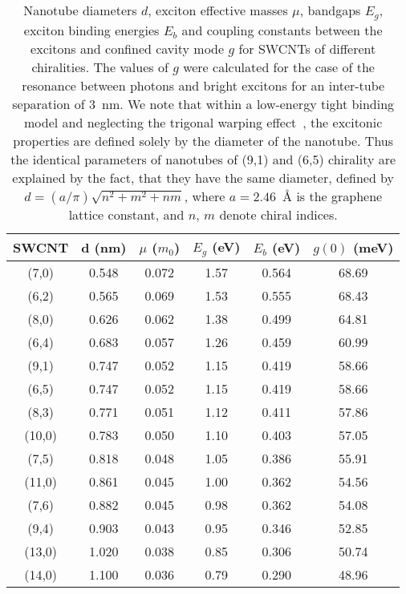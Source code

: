 \documentclass[journal=aamick,manuscript=article]{achemso}
\begin{document}
\begin{table}
\centering
    \begin{tabular}{c c c c c c}
        \hline
        SWCNT & d (nm) & $\mu$ ($m_0$) & $E_g$ (eV) & $E_b$ (eV) & $g(0)$ (meV)   \\ \hline
        (7,0) & 0.548  & 0.072         & 1.57       & 0.564       & 68.69         \\ \hline
        (6,2) & 0.565  & 0.069         & 1.53       & 0.555       & 68.43         \\ \hline
        (8,0) & 0.626  & 0.062         & 1.38       & 0.499       & 64.81         \\ \hline
        (6,4) & 0.683  & 0.057         & 1.26       & 0.459       & 60.99         \\ \hline
        (9,1) & 0.747  & 0.052         & 1.15       & 0.419       & 58.66         \\ \hline
        (6,5) & 0.747  & 0.052         & 1.15       & 0.419       & 58.66         \\ \hline
        (8,3) & 0.771  & 0.051         & 1.12       & 0.411       & 57.86         \\ \hline
       (10,0) & 0.783  & 0.050         & 1.10       & 0.403       & 57.05         \\ \hline
        (7,5) & 0.818  & 0.048         & 1.05       & 0.386       & 55.91         \\ \hline
       (11,0) & 0.861  & 0.045         & 1.00       & 0.362       & 54.56         \\ \hline
        (7,6) & 0.882  & 0.045         & 0.98       & 0.362       & 54.08         \\ \hline
        (9,4) & 0.903  & 0.043         & 0.95       & 0.346       & 52.85         \\ \hline
       (13,0) & 1.020  & 0.038         & 0.85       & 0.306       & 50.74         \\ \hline
       (14,0) & 1.100  & 0.036         & 0.79       & 0.290       & 48.96         \\ \hline
    \end{tabular}
    \caption{Nanotube diameters $d$, exciton effective masses $\mu$, bandgaps $E_g$, exciton binding energies $E_b$ and coupling constants between the excitons and confined cavity mode $g$ for SWCNTs of different chiralities.
The values of $g$ were calculated for the case of the resonance between photons and bright excitons for an inter-tube separation of $3$~nm.
We note that within a low-energy tight binding model and neglecting the trigonal warping effect~\cite{Saito2000}, the excitonic properties are defined solely by the diameter of the nanotube.
Thus the identical parameters of nanotubes of (9,1) and (6,5) chirality are explained by the fact, that they have the same diameter, defined by $d=(a/\pi)\sqrt{n^2+m^2+nm}$, where $a=2.46$~\AA{ }is the graphene lattice constant, and $n$, $m$ denote chiral indices. }
    \label{tbl}
\end{table}
\end{document}
